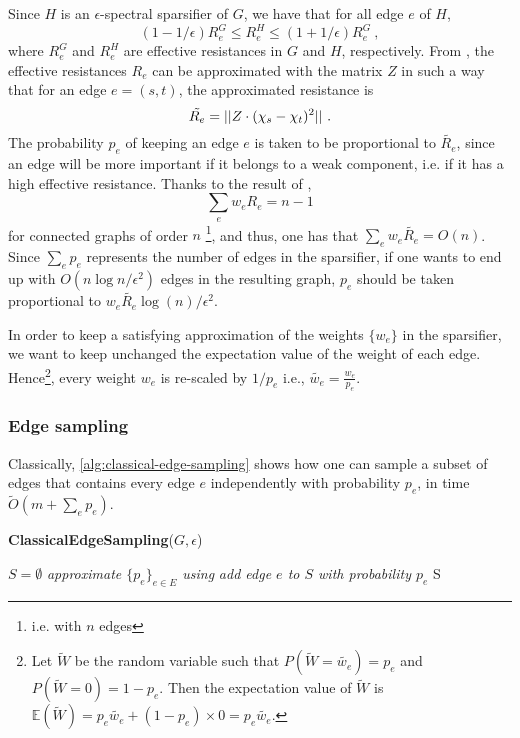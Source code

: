 Since $H$ is an $\epsilon$-spectral sparsifier of $G$, we have that for all edge $e$ of $H$,
\begin{equation*}
    (1-1/\epsilon) R^G_e \leq R^H_e \leq (1+1/\epsilon) R^G_e \ ,
\end{equation*} where $R^G_e$ and $R^H_e$ are effective resistances in $G$ and $H$, respectively.
From , the effective resistances $R_e$ can be approximated with the matrix $Z$
in such a way that for an edge $e = (s,t)$, the approximated resistance is
\begin{equation*}
    \tilde{R_e} = || Z \cdot (\chi_s-\chi_t)^2 || \text{ .}
\end{equation*}
The probability $p_e$ of keeping an edge $e$ is taken to be proportional to $ \tilde{R_e}$, since an edge will be more important if it belongs to a weak component, i.e. if it has a high effective resistance. Thanks to the result of
\citeauthor{bollobas_modern_1998} \cite[Theorem 25]{bollobas_modern_1998},
$$\sum_e w_e R_e = n-1$$
for connected graphs of order $n$ \footnote{i.e. with $n$ edges}, and thus, one has that $\sum_e w_e \tilde{R_e} = O(n)$. Since $\sum_e p_e$ represents the number of edges in the sparsifier, if one wants to end up with  $O(n \log n /\epsilon^2)$ edges in the resulting graph, $p_e$ should be taken proportional to $w_e \tilde{R_e} \log (n) / \epsilon^2$.


In order to keep a satisfying approximation of the weights $\{w_e\}$ in the sparsifier, we want to keep unchanged the expectation value of the weight of each edge.
Hence\footnote{Let $\tilde{W}$ be the random variable such that $P(\tilde{W}= \tilde{w_e}) = p_e$ and $P(\tilde{W}= {0}) = 1 - p_e$. Then the expectation value of $\tilde{W}$ is $\mathbb{E}(\tilde{W}) = p_e \tilde{w_e} + (1-p_e) \times 0  = p_e \tilde{w_e}$.}, every weight $w_e$ is re-scaled by $1/p_e$ i.e., $\tilde{w_e} = \frac{w_e}{p_e}$.


\subsubsection{Edge sampling}

Classically, \autoref{alg:classical-edge-sampling} shows how one can sample
a subset of edges that contains every edge $e$ independently with
probability $p_e$, in time $\tilde{O}(m + \sum_e p_e)$.

\begin{algorithm}[H]
    \caption{\textbf{ClassicalEdgeSampling}($G,\epsilon$)}\label{alg:classical-edge-sampling}
    \begin{algorithmic}[1]
    \Require $S = \emptyset$
    \State \textit{approximate $\{p_e\}_{e\in E}$ using }
        \State \textit{add edge $e$ to $S$ with probability $p_e$ }
        \EndFor
    \State \Return S
    \end{algorithmic}
\end{algorithm}


